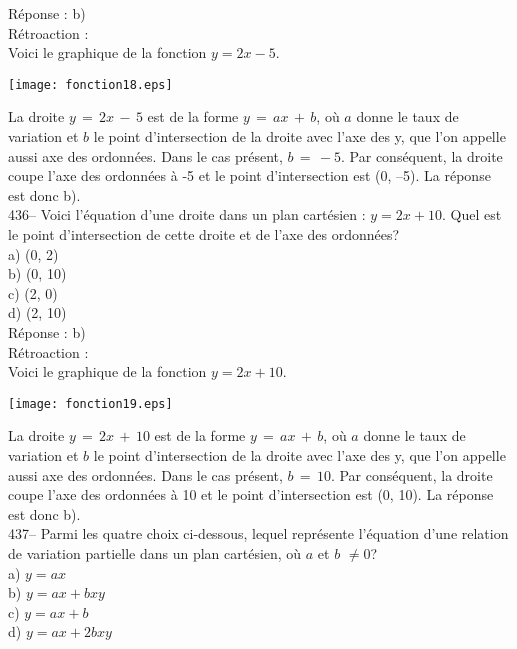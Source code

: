 ﻿\documentclass[letterpaper, 12pt]{article}
\begin{document}
R\'eponse :  b)\\

R\'etroaction : \\
Voici le graphique de la fonction $y=2x-5$.\\
    \begin{center}
    \texttt{[image: fonction18.eps]}
    \end{center}

La droite $y\,=\,2x\,-\,5$ est de la forme $y\,=\,ax\,+\,b$, o\`u
$a$ donne le taux de variation et $b$ le point d'intersection de la
droite avec l'axe des y, que l'on appelle aussi axe des ordonn\'ees.
Dans le cas pr\'esent, $b\,=\,-5$. Par cons\'equent, la droite coupe
l'axe des ordonn\'ees \`a -5 et le point d'intersection est (0,
--5).
La r\'eponse est donc b).\\

436-- Voici l'\'equation d'une droite dans un plan cart\'esien : $y=2x+10$.
Quel est le point d'intersection de cette droite et de l'axe des
ordonn\'ees?\\
a) (0, 2)\\
b) (0, 10)\\
c) (2, 0)\\
d) (2, 10)\\

R\'eponse :  b)\\

R\'etroaction : \\
Voici le graphique de la fonction $y=2x+10$.\\
    \begin{center}
    \texttt{[image: fonction19.eps]}
    \end{center}

La droite $y\,=\,2x\,+\,10$ est de la forme $y\,=\,ax\,+\,b$, o\`u
$a$ donne le taux de variation et $b$ le point d'intersection de la
droite avec l'axe des y, que l'on appelle aussi axe des ordonn\'ees.
Dans le cas pr\'esent, $b\,=\,10$.  Par cons\'equent, la droite
coupe l'axe des ordonn\'ees \`a 10 et le point d'intersection est
(0, 10). La r\'eponse est donc
b).\\

437-- Parmi les quatre choix ci-dessous, lequel repr\'esente l'\'equation
d'une relation de variation partielle dans un plan cart\'esien, o\`u $a$ et
$b$ $\neq0$?\\
a) $y=ax$\\
b) $y=ax+bxy$\\
c) $y=ax+b$\\
d) $y=ax+2bxy$\\
\end{document}
